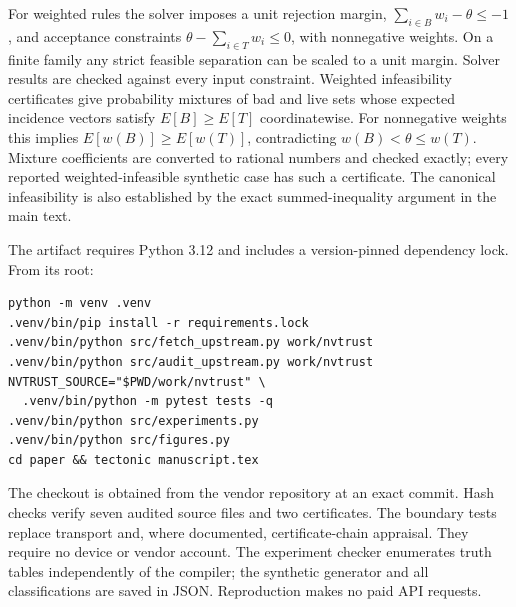 \documentclass[11pt,letterpaper]{article}
\begin{document}
For weighted rules the solver imposes a unit rejection margin, $\sum_{i\in B}w_i-\theta\leq-1$, and acceptance constraints $\theta-\sum_{i\in T}w_i\leq0$, with nonnegative weights. On a finite family any strict feasible separation can be scaled to a unit margin. Solver results are checked against every input constraint. Weighted infeasibility certificates give probability mixtures of bad and live sets whose expected incidence vectors satisfy $E[B]\geq E[T]$ coordinatewise. For nonnegative weights this implies $E[w(B)]\geq E[w(T)]$, contradicting $w(B)<\theta\leq w(T)$. Mixture coefficients are converted to rational numbers and checked exactly; every reported weighted-infeasible synthetic case has such a certificate. The canonical infeasibility is also established by the exact summed-inequality argument in the main text.

The artifact requires Python 3.12 and includes a version-pinned dependency lock. From its root:
\begin{verbatim}
python -m venv .venv
.venv/bin/pip install -r requirements.lock
.venv/bin/python src/fetch_upstream.py work/nvtrust
.venv/bin/python src/audit_upstream.py work/nvtrust
NVTRUST_SOURCE="$PWD/work/nvtrust" \
  .venv/bin/python -m pytest tests -q
.venv/bin/python src/experiments.py
.venv/bin/python src/figures.py
cd paper && tectonic manuscript.tex
\end{verbatim}
The checkout is obtained from the vendor repository at an exact commit. Hash checks verify seven audited source files and two certificates. The boundary tests replace transport and, where documented, certificate-chain appraisal. They require no device or vendor account. The experiment checker enumerates truth tables independently of the compiler; the synthetic generator and all classifications are saved in JSON. Reproduction makes no paid API requests.
\end{document}
